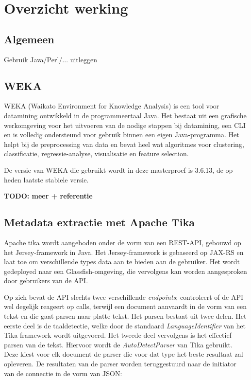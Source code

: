 \chapter{Overzicht werking}\label{hs:werking}

\section{Algemeen}
Gebruik Java/Perl/... uitleggen

\section{WEKA}
WEKA (Waikato Environment for Knowledge Analysis) is een tool voor datamining ontwikkeld in de programmeertaal Java. Het bestaat uit een grafische werkomgeving  voor het uitvoeren van de nodige stappen bij datamining, een CLI en is volledig ondersteund voor gebruik binnen een eigen Java-programma. Het helpt bij de preprocessing van data en bevat heel wat algoritmes voor clustering, classificatie, regressie-analyse, visualisatie en feature selection.

De versie van WEKA die gebruikt wordt in deze masterproef is 3.6.13, de op heden laatste stabiele versie.

\textbf{TODO: meer + referentie}

\section{Metadata extractie met Apache Tika}
Apache tika wordt aangeboden onder de vorm van een REST-API, gebouwd op het Jersey-framework in Java. Het Jersey-framework is gebaseerd op JAX-RS en laat toe om verschillende types data aan te bieden aan de gebruiker. Het wordt gedeployed naar een Glassfish-omgeving, die vervolgens kan worden aangesproken door gebruikers van de API.

Op zich bevat de API slechts twee verschillende \textit{endpoints};  controleert of de API wel degelijk reageert op calls, terwijl  een document aanvaardt in de vorm van een tekst en die gaat parsen naar platte tekst. Het parsen bestaat uit twee delen. Het eerste deel is de taaldetectie, welke door de standaard \textit{LanguageIdentifier} van het Tika framework wordt uitgevoerd. Het tweede deel vervolgens is het effectief parsen van de tekst. Hiervoor wordt de \textit{AutoDetectParser} van Tika gebruikt. Deze kiest voor elk document de parser die voor dat type het beste resultaat zal opleveren.
De resultaten van de parser worden teruggestuurd naar de initiator van de connectie in de vorm van JSON:

